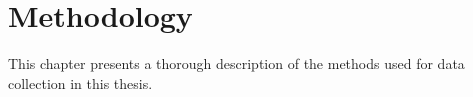 \chapter{Methodology}
\label{chap::methodology}
This chapter presents a thorough description of the methods used for data collection in this thesis.

